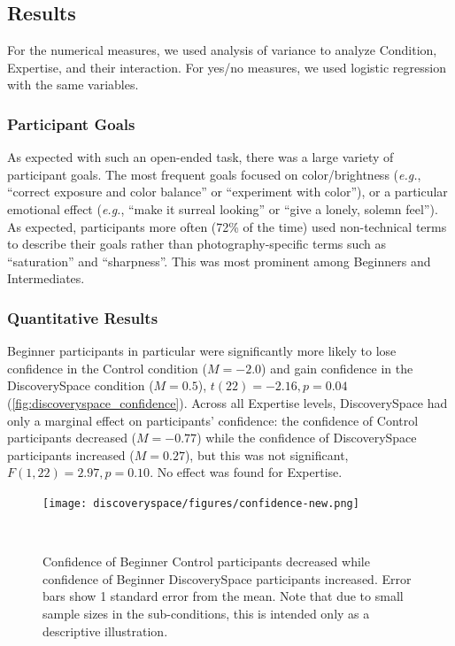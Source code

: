 \subsection{Results}
For the numerical measures, we used analysis of variance to analyze Condition, Expertise, and their interaction. For yes/no measures, we used logistic regression with the same variables. 

\subsubsection{Participant Goals}
As expected with such an open-ended task, there was a large variety of participant goals. The most frequent goals focused on color/brightness (\textit{e.g.}, ``correct exposure and color balance'' or ``experiment with color''), or a particular emotional effect (\textit{e.g.}, ``make it surreal looking'' or ``give a lonely, solemn feel''). As expected, participants more often (72\% of the time) used non-technical terms to describe their goals rather than photography-specific terms such as ``saturation'' and ``sharpness''. This was most prominent among Beginners and Intermediates.

\subsubsection{Quantitative Results}
Beginner participants in particular were significantly more likely to lose confidence in the Control condition ($M = -2.0$) and gain confidence in the Discovery\-Space condition ($M = 0.5$), $t(22) = -2.16, p = 0.04$ (\autoref{fig:discoveryspace_confidence}). Across all Expertise levels, Discovery\-Space had only a marginal effect on participants' confidence: the confidence of Control participants decreased ($M = -0.77$) while the confidence of Discovery\-Space participants increased ($M = 0.27$), but this was not significant, $F(1, 22) = 2.97, p = 0.10$. No effect was found for Expertise. 

\begin{figure}
\centering
  \texttt{[image: discoveryspace/figures/confidence-new.png]}
  \caption{Confidence of Beginner Control participants decreased while confidence of Beginner Discovery\-Space participants increased. Error bars show 1 standard error from the mean. Note that due to small sample sizes in the sub-conditions, this is intended only as a descriptive illustration.}~\label{fig:discoveryspace_confidence}
\end{figure}

